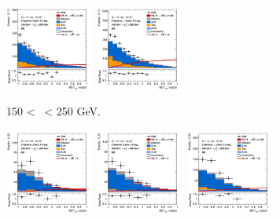 \begin{figure}[h!]
\begin{subfigure}[b]{\textwidth}
        \includegraphics[width=0.32\textwidth]{Images/VH/Own_fit/prefit_VHbb/Region_distmva_BMax250_BMin150_DSR_J3_TTypebb_T2_L2_Y6051_Prefit.png}
        \includegraphics[width=0.32\textwidth]{Images/VH/Own_fit/prefit_VHbb/Region_distmva_BMax250_BMin150_DSR_J4_TTypebb_incJet1_T2_L2_Y6051_Prefit.png}
        \caption{150 < \ptv\ < 250 GeV.}
        \label{fig:plots_VHbb_2L_150_SR}
    \end{subfigure}
    \begin{subfigure}[b]{\textwidth}
        \centering
        \includegraphics[width=0.32\textwidth]{Images/VH/Own_fit/prefit_VHbb/Region_distmva_BMax400_BMin250_DSR_J2_TTypebb_T2_L2_Y6051_Prefit.png}
        \includegraphics[width=0.32\textwidth]{Images/VH/Own_fit/prefit_VHbb/Region_distmva_BMax400_BMin250_DSR_J3_TTypebb_T2_L2_Y6051_Prefit.png}
        \includegraphics[width=0.32\textwidth]{Images/VH/Own_fit/prefit_VHbb/Region_distmva_BMax400_BMin250_DSR_J4_TTypebb_incJet1_T2_L2_Y6051_Prefit.png}

\end{subfigure}
\end{figure}
